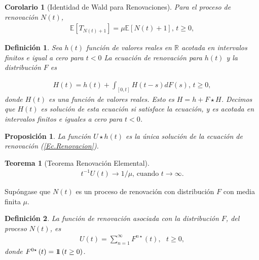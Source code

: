 \documentclass{article}
\newtheorem{Def}{Definición}[section]
\newtheorem{Teo}{Teorema}[section]
\newtheorem{Prop}{Proposición}[section]
\newtheorem{Coro}{Corolario}[section]
\newcommand{\rea}{\mathbb{R}}
\newcommand{\esp}{\mathbb{E}}
\newcommand{\indora}{\mbox{$1$\hspace{-0.8ex}$1$}}
\numberwithin{equation}{section}
\begin{document}
{\begin{Coro}[Identidad de Wald para Renovaciones]
Para el proceso de renovaci\'on $N\left(t\right)$,
\begin{eqnarray*}
\esp\left[T_{N\left(t\right)+1}\right]=\mu\esp\left[N\left(t\right)+1\right]\textrm{,  }t\geq0,
\end{eqnarray*}  
\end{Coro}


\begin{Def}
Sea $h\left(t\right)$ funci\'on de valores reales en $\rea$ acotada en intervalos finitos e igual a cero para $t<0$ La ecuaci\'on de renovaci\'on para $h\left(t\right)$ y la distribuci\'on $F$ es

\begin{eqnarray}%
H\left(t\right)=h\left(t\right)+\int_{\left[0,t\right]}H\left(t-s\right)dF\left(s\right)\textrm{,    }t\geq0,
\end{eqnarray}
donde $H\left(t\right)$ es una funci\'on de valores reales. Esto es $H=h+F\star H$. Decimos que $H\left(t\right)$ es soluci\'on de esta ecuaci\'on si satisface la ecuaci\'on, y es acotada en intervalos finitos e iguales a cero para $t<0$.
\end{Def}

\begin{Prop}
La funci\'on $U\star h\left(t\right)$ es la \'unica soluci\'on de la ecuaci\'on de renovaci\'on (\ref{Ec.Renovacion}).
\end{Prop}

\begin{Teo}[Teorema Renovaci\'on Elemental]
\begin{eqnarray*}
t^{-1}U\left(t\right)\rightarrow 1/\mu\textrm{,    cuando }t\rightarrow\infty.
\end{eqnarray*}
\end{Teo}



Sup\'ongase que $N\left(t\right)$ es un proceso de renovaci\'on con distribuci\'on $F$ con media finita $\mu$.

\begin{Def}
La funci\'on de renovaci\'on asociada con la distribuci\'on $F$, del proceso $N\left(t\right)$, es
\begin{eqnarray*}
U\left(t\right)=\sum_{n=1}^{\infty}F^{n\star}\left(t\right),\textrm{   }t\geq0,
\end{eqnarray*}
donde $F^{0\star}\left(t\right)=\indora\left(t\geq0\right)$.
\end{Def}


}
\end{document}
